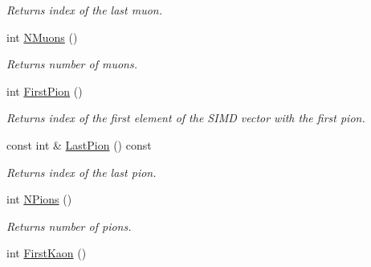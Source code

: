 \begin{DoxyCompactItemize}
\begin{DoxyCompactList}\small\item\em Returns index of the last muon. \end{DoxyCompactList}\item 
int \hyperlink{classKFPTrackVector_aa37ac54eb81454b271e8c7799dcaa8df}{N\+Muons} ()\hypertarget{classKFPTrackVector_aa37ac54eb81454b271e8c7799dcaa8df}{}\label{classKFPTrackVector_aa37ac54eb81454b271e8c7799dcaa8df}

\begin{DoxyCompactList}\small\item\em Returns number of muons. \end{DoxyCompactList}\item 
int \hyperlink{classKFPTrackVector_a63b52f72cb7a2dc272b851d96487ee9e}{First\+Pion} ()\hypertarget{classKFPTrackVector_a63b52f72cb7a2dc272b851d96487ee9e}{}\label{classKFPTrackVector_a63b52f72cb7a2dc272b851d96487ee9e}

\begin{DoxyCompactList}\small\item\em Returns index of the first element of the S\+I\+MD vector with the first pion. \end{DoxyCompactList}\item 
const int \& \hyperlink{classKFPTrackVector_a113e590beda0c6c3ffbc3082b26225f3}{Last\+Pion} () const \hypertarget{classKFPTrackVector_a113e590beda0c6c3ffbc3082b26225f3}{}\label{classKFPTrackVector_a113e590beda0c6c3ffbc3082b26225f3}

\begin{DoxyCompactList}\small\item\em Returns index of the last pion. \end{DoxyCompactList}\item 
int \hyperlink{classKFPTrackVector_a147c85432bbe97f4d49f13d1a0c2c72e}{N\+Pions} ()\hypertarget{classKFPTrackVector_a147c85432bbe97f4d49f13d1a0c2c72e}{}\label{classKFPTrackVector_a147c85432bbe97f4d49f13d1a0c2c72e}

\begin{DoxyCompactList}\small\item\em Returns number of pions. \end{DoxyCompactList}\item 
int \hyperlink{classKFPTrackVector_a10185b227dabdbf526955adfe9a476f2}{First\+Kaon} ()\hypertarget{classKFPTrackVector_a10185b227dabdbf526955adfe9a476f2}{}\label{classKFPTrackVector_a10185b227dabdbf526955adfe9a476f2}


\end{DoxyCompactItemize}
